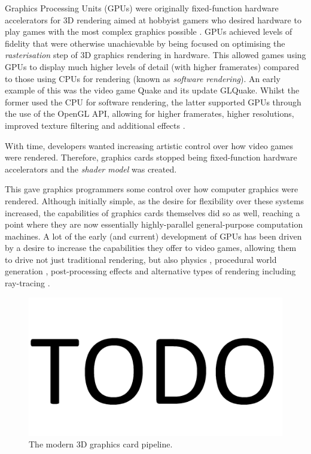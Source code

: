 \documentclass[a4paper,12pt,twoside,openright]{report}
\begin{document}
\label{sec:history_gpu}

Graphics Processing Units (GPUs) were originally fixed-function hardware
accelerators for 3D rendering aimed at hobbyist gamers who desired hardware to
play games with the most complex graphics possible \cite{TODO}. GPUs achieved
levels of fidelity that were otherwise unachievable by being focused on
optimising the \textit{rasterisation} step of 3D graphics rendering in
hardware. This allowed games using GPUs to display much higher levels of detail
(with higher framerates) compared to those using CPUs for rendering (known as
\textit{software rendering}). An early example of this was the video game Quake
and its update GLQuake. Whilst the former used the CPU for software rendering,
the latter supported GPUs through the use of the OpenGL API, allowing for
higher framerates, higher resolutions, improved texture filtering and
additional effects \cite{GLQuake}.

With time, developers wanted increasing artistic control over how video games
were rendered. Therefore, graphics cards stopped being fixed-function hardware
accelerators and the \textit{shader model} was created.

This gave graphics programmers some control over how computer graphics were
rendered. Although initially simple, as the desire for flexibility over these
systems increased, the capabilities of graphics cards themselves did so as
well, reaching a point where they are now essentially highly-parallel
general-purpose computation machines. A lot of the early (and current)
development of GPUs has been driven by a desire to increase the capabilities
they offer to video games, allowing them to drive not just traditional
rendering, but also physics \cite{TODO}, procedural world generation
\cite{TODO}, post-processing effects \cite{TODO} and alternative types of
rendering including ray-tracing \cite{TODO}.

\begin{figure}[h]
\centering
\includegraphics[width=0.8\linewidth]{TODO}
\caption{The modern 3D graphics card pipeline.}
\label{fig:graphics_pipeline}
\end{figure}
\end{document}
